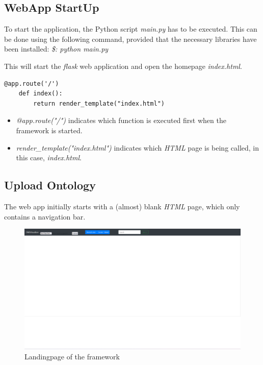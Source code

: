 \subsection{WebApp StartUp} 

To start the application, the Python script \textit{main.py} has to be executed. This can be done using the following command, provided that the necessary libraries have been installed:
\textit{\$: python main.py}

This will start the \textit{flask} web application and open the homepage \textit{index.html}.

\begin{lstlisting}[caption={Application StartUp},captionpos=b]
    @app.route('/')
    def index():
        return render_template("index.html")
\end{lstlisting}


\begin{itemize}
        \item \textit{@app.route("/")} indicates which function is executed first when the framework is started.
        \item \textit{render\_template("index.html")} indicates which \textit{HTML} page is being called, in this case, \textit{index.html}.
\end{itemize}

\subsection{Upload Ontology}

The web app initially starts with a (almost) blank \textit{HTML} page, which only contains a navigation bar. 
\begin{figure}[H]
    \includegraphics[scale=0.25]{Graphics/webapp_startupt_html.png}
    \caption{Landingpage of the framework}
\end{figure}

